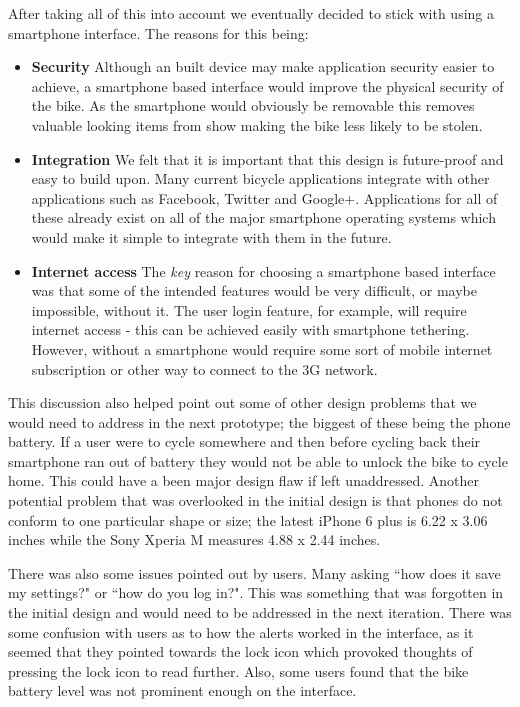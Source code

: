 \documentclass[a4paper]{report}
\begin{document}
{After taking all of this into account we eventually decided to stick with using a smartphone interface. The reasons for this being:
\begin{itemize}
  \item \textbf{Security} Although an built device may make application security easier to achieve, a smartphone based interface would improve the physical security of the bike. As the smartphone would obviously be removable this removes valuable looking items from show making the bike less likely to be stolen.
  \item \textbf{Integration} We felt that it is important that this design is future-proof and easy to build upon. Many current bicycle applications integrate with other applications such as Facebook, Twitter and Google+. Applications for all of these already exist on all of the major smartphone operating systems which would make it simple to integrate with them in the future.
  \item \textbf{Internet access} The \textit{key} reason for choosing a smartphone based interface was that some of the intended features would be very difficult, or maybe impossible, without it. The user login feature, for example, will require internet access - this can be achieved easily with smartphone tethering. However, without a smartphone would require some sort of mobile internet subscription or other way to connect to the 3G network.
\end{itemize}
This discussion also helped point out some of other design problems that we would need to address in the next prototype; the biggest of these being the phone battery. If a user were to cycle somewhere and then before cycling back their smartphone ran out of battery they would not be able to unlock the bike to cycle home. This could have a been major design flaw if left unaddressed. Another potential problem that was overlooked in the initial design is that phones do not conform to one particular shape or size; the latest iPhone 6 plus is 6.22 x 3.06 inches while the Sony Xperia M measures 4.88 x 2.44 inches.

There was also some issues pointed out by users. Many asking ``how does it save my settings?" or ``how do you log in?". This was something that was forgotten in the initial design and would need to be addressed in the next iteration. There was some confusion with users as to how the alerts worked in the interface, as it seemed that they pointed towards the lock icon which provoked thoughts of pressing the lock icon to read further. Also, some users found that the bike battery level was not prominent enough on the interface. 
}
\end{document}
